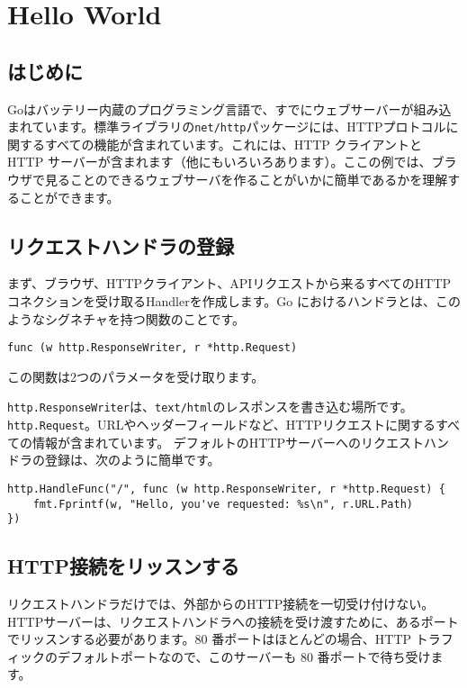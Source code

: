 \section{Hello World}

\subsection{はじめに}

Goはバッテリー内蔵のプログラミング言語で、すでにウェブサーバーが組み込まれています。標準ライブラリの\texttt{net/http}パッケージには、HTTPプロトコルに関するすべての機能が含まれています。これには、HTTP クライアントと HTTP サーバーが含まれます（他にもいろいろあります）。ここの例では、ブラウザで見ることのできるウェブサーバを作ることがいかに簡単であるかを理解することができます。

\subsection{リクエストハンドラの登録}

まず、ブラウザ、HTTPクライアント、APIリクエストから来るすべてのHTTPコネクションを受け取るHandlerを作成します。Go におけるハンドラとは、このようなシグネチャを持つ関数のことです。


\begin{lstlisting}[numbers=none]
func (w http.ResponseWriter, r *http.Request)
\end{lstlisting}

この関数は2つのパラメータを受け取ります。

\texttt{http.ResponseWriter}は、\texttt{text/html}のレスポンスを書き込む場所です。
\texttt{http.Request}。URLやヘッダーフィールドなど、HTTPリクエストに関するすべての情報が含まれています。
デフォルトのHTTPサーバーへのリクエストハンドラの登録は、次のように簡単です。

\begin{lstlisting}[numbers=none]
http.HandleFunc("/", func (w http.ResponseWriter, r *http.Request) {
    fmt.Fprintf(w, "Hello, you've requested: %s\n", r.URL.Path)
})
\end{lstlisting}

\subsection{HTTP接続をリッスンする}

リクエストハンドラだけでは、外部からのHTTP接続を一切受け付けない。HTTPサーバーは、リクエストハンドラへの接続を受け渡すために、あるポートでリッスンする必要があります。80 番ポートはほとんどの場合、HTTP トラフィックのデフォルトポートなので、このサーバーも 80 番ポートで待ち受けます。

